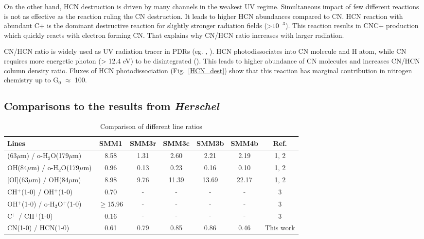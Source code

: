 \documentclass{aa}
\begin{document}
On the other hand, HCN destruction is driven by many channels in the weakest UV regime. Simultaneous
impact of few different reactions is not as effective as the reaction ruling the CN destruction. It
leads to higher HCN abundances compared to CN. HCN reaction with abundant C+ is the dominant
destructive reaction for slightly stronger radiation fields (>$10^{-3}$). This reaction results in
CNC+ production which quickly reacts with electron forming CN. That explains why CN/HCN ratio
increases with larger radiation.

CN/HCN ratio is widely used as UV radiation tracer in PDRs (eg. \citealt{Thi04}, \citealt{Han15}).
HCN photodissociates into CN molecule and H atom, while CN requires more energetic photon (> 12.4
eV) to be disintegrated (\citealt{vDi87}). This leads to higher abundance of CN molecules and
increases CN/HCN column density ratio. Fluxes of HCN photodissociation (Fig.~\ref{HCN_dest}) show
that this reaction has marginal contribution in nitrogen chemistry up to G$_0$ $\approx$ 100.

\subsection{Comparisons to the results from \textit{Herschel}}

\begin{table*} 
\caption{Comparison of different line ratios}      
\centering       %
\label{line_ratios}    

\begin{tabular}{l c c c c c c} 
\hline\hline 
Lines & SMM1  & SMM3r  & SMM3c & SMM3b & SMM4b & Ref. \\ 
\hline 
[OI](63$\mu$m) / o-H$_2$O(179$\mu$m) & 8.58 & 1.31 & 2.60 & 2.21 & 2.19 & 1, 2 \\ 
OH(84$\mu$m) / o-H$_2$O(179$\mu$m) & 0.96 & 0.13 & 0.23 & 0.16 & 0.10 & 1, 2 \\ 
\mbox{[OI](63$\mu$m)} / OH(84$\mu$m) & 8.98 & 9.76 & 11.39 & 13.69 & 22.17 & 1, 2 \\
CH$^+$(1-0) / OH$^+$(1-0) & 0.70 & - & - & - & - & 3\\ 
OH$^+$(1-0) / o-H$_2$O$^+$(1-0) & $\geq$15.96 & - & - & - & -& 3\\
C$^+$ / CH$^+$(1-0) & 0.16 & - & - & - & -& 3\\
CN(1-0) / HCN(1-0) & 0.61 & 0.79 & 0.85 & 0.86 & 0.46 & This work\\
\hline \end{tabular} 
\end{table*}
\end{document}
